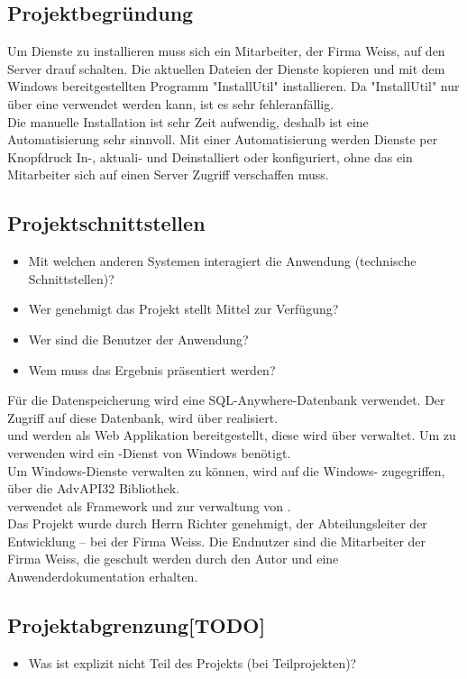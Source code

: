 \subsection{Projektbegründung} 
\label{sec:Projektbegruendung}
Um Dienste zu installieren muss sich ein Mitarbeiter, der Firma Weiss, auf den Server drauf schalten. 
Die aktuellen Dateien der Dienste kopieren und mit dem Windows bereitgestellten Programm "InstallUtil" installieren. Da "InstallUtil" nur über eine  verwendet werden kann, ist es sehr fehleranfällig. \\
Die manuelle Installation ist sehr Zeit aufwendig, deshalb ist eine Automatisierung sehr sinnvoll.
Mit einer Automatisierung werden Dienste per Knopfdruck In-, aktuali- und Deinstalliert oder konfiguriert, ohne das ein Mitarbeiter sich auf einen Server Zugriff verschaffen muss. 

\subsection{Projektschnittstellen} 
\label{sec:Projektschnittstellen}
\begin{itemize}
	\item Mit welchen anderen Systemen interagiert die Anwendung (technische Schnittstellen)?
	\item Wer genehmigt das Projekt \bzw stellt Mittel zur Verfügung? 
	\item Wer sind die Benutzer der Anwendung?
	\item Wem muss das Ergebnis präsentiert werden?
\end{itemize}
Für die Datenspeicherung wird eine SQL-Anywhere-Datenbank verwendet. Der Zugriff auf diese Datenbank, wird über  realisiert. \\
 und  werden als Web Applikation bereitgestellt, diese wird über  verwaltet. Um  zu verwenden wird ein -Dienst von Windows benötigt. \\
Um Windows-Dienste verwalten zu können, wird auf die Windows- zugegriffen, über die AdvAPI32 Bibliothek. \\
 verwendet  als Framework und  zur verwaltung von . 
\\
Das Projekt wurde durch Herrn Richter genehmigt, der Abteilungsleiter der Entwicklung – bei der Firma Weiss. Die Endnutzer sind die Mitarbeiter der Firma Weiss, die geschult werden durch den Autor und eine Anwenderdokumentation erhalten. \\

\subsection{Projektabgrenzung[TODO]} 
\label{sec:Projektabgrenzung}
\begin{itemize}
	\item Was ist explizit nicht Teil des Projekts (\insb bei Teilprojekten)?
\end{itemize}
